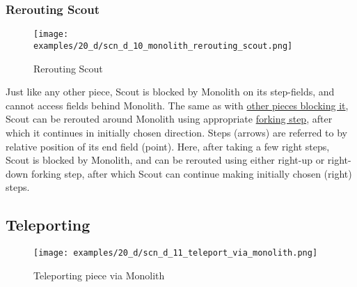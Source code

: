 \clearpage %

\subsubsection*{Rerouting Scout}
\label{sec:Discovery/Monolith/Movement/Rerouting Scout}

\vspace*{-0.7\baselineskip}
\noindent
\begin{wrapfigure}[9]{l}{0.4\textwidth}
\centering
\texttt{[image: examples/20\_d/scn\_d\_10\_monolith\_rerouting\_scout.png]}
\caption{Rerouting Scout}
\label{fig:scn_d_10_monolith_rerouting_scout}
\end{wrapfigure}
Just like any other piece, Scout is blocked by Monolith on its step-fields, and
cannot access fields behind Monolith. \newline
\indent
The same as with
\hyperref[fig:scn_hd_20_scout_rerouting]{other pieces blocking it}, Scout can be
rerouted around Monolith using appropriate
\hyperref[fig:scn_hd_17_scout_forking_steps]{forking step}, after which it continues
in initially chosen direction. \newline
\indent
Steps (arrows) are referred to by relative position of its end field (point).
Here, after taking a few right steps, Scout is blocked by Monolith, and can be
rerouted using either right-up or right-down forking step, after which Scout
can continue making initially chosen (right) steps.

\clearpage %

\subsection*{Teleporting}
\label{sec:Discovery/Monolith/Teleporting}

\vspace*{-1.4\baselineskip}
\noindent
\begin{figure}[!h]
\texttt{[image: examples/20\_d/scn\_d\_11\_teleport\_via\_monolith.png]}
\vspace*{-1.3\baselineskip}
\caption{Teleporting piece via Monolith}
\label{fig:scn_d_11_teleport_via_monolith}
\end{figure}

